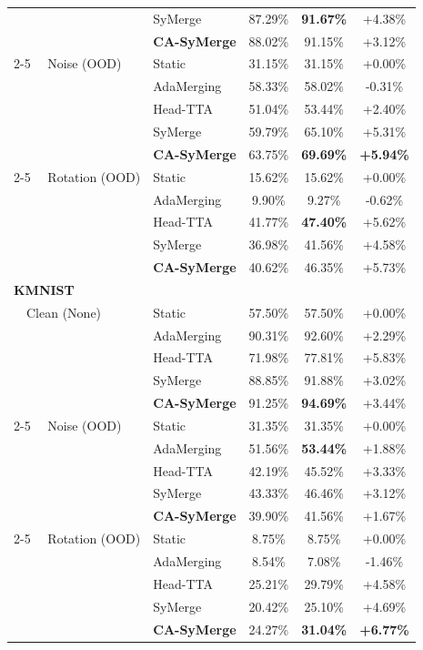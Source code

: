 \documentclass{article}
\begin{document}
\begin{table}[t]
\begin{tabular}{llccc}
               & SyMerge & 87.29\% & \textbf{91.67\%} & +4.38\% \\
               & \textbf{CA-SyMerge} & 88.02\% & 91.15\% & +3.12\% \\
\cmidrule{2-5}
~~Noise (OOD) & Static & 31.15\% & 31.15\% & +0.00\% \\
               & AdaMerging & 58.33\% & 58.02\% & -0.31\% \\
               & Head-TTA & 51.04\% & 53.44\% & +2.40\% \\
               & SyMerge & 59.79\% & 65.10\% & +5.31\% \\
               & \textbf{CA-SyMerge} & 63.75\% & \textbf{69.69\%} & \textbf{+5.94\%} \\
\cmidrule{2-5}
~~Rotation (OOD) & Static & 15.62\% & 15.62\% & +0.00\% \\
               & AdaMerging & 9.90\% & 9.27\% & -0.62\% \\
               & Head-TTA & 41.77\% & \textbf{47.40\%} & +5.62\% \\
               & SyMerge & 36.98\% & 41.56\% & +4.58\% \\
               & \textbf{CA-SyMerge} & 40.62\% & 46.35\% & +5.73\% \\
\midrule
\textbf{KMNIST} \\
~~Clean (None) & Static & 57.50\% & 57.50\% & +0.00\% \\
               & AdaMerging & 90.31\% & 92.60\% & +2.29\% \\
               & Head-TTA & 71.98\% & 77.81\% & +5.83\% \\
               & SyMerge & 88.85\% & 91.88\% & +3.02\% \\
               & \textbf{CA-SyMerge} & 91.25\% & \textbf{94.69\%} & +3.44\% \\
\cmidrule{2-5}
~~Noise (OOD) & Static & 31.35\% & 31.35\% & +0.00\% \\
               & AdaMerging & 51.56\% & \textbf{53.44\%} & +1.88\% \\
               & Head-TTA & 42.19\% & 45.52\% & +3.33\% \\
               & SyMerge & 43.33\% & 46.46\% & +3.12\% \\
               & \textbf{CA-SyMerge} & 39.90\% & 41.56\% & +1.67\% \\
\cmidrule{2-5}
~~Rotation (OOD) & Static & 8.75\% & 8.75\% & +0.00\% \\
               & AdaMerging & 8.54\% & 7.08\% & -1.46\% \\
               & Head-TTA & 25.21\% & 29.79\% & +4.58\% \\
               & SyMerge & 20.42\% & 25.10\% & +4.69\% \\
               & \textbf{CA-SyMerge} & 24.27\% & \textbf{31.04\%} & \textbf{+6.77\%} \\
\bottomrule
\end{tabular}%
\vspace{-3mm}
\end{table}
\end{document}
